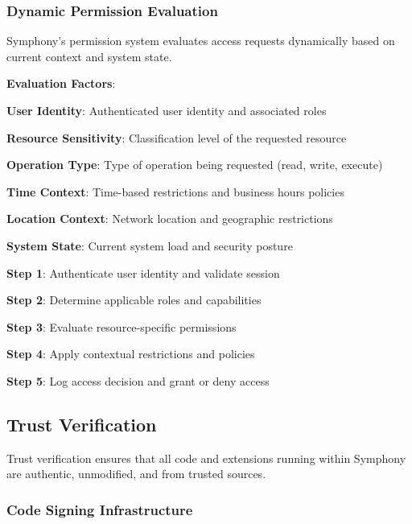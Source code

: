 \subsubsection*{Dynamic Permission Evaluation}

Symphony's permission system evaluates access requests dynamically based on current context and system state.

\textbf{Evaluation Factors}:
\begin{compactlist}
    \item \textbf{User Identity}: Authenticated user identity and associated roles
    \item \textbf{Resource Sensitivity}: Classification level of the requested resource
    \item \textbf{Operation Type}: Type of operation being requested (read, write, execute)
    \item \textbf{Time Context}: Time-based restrictions and business hours policies
    \item \textbf{Location Context}: Network location and geographic restrictions
    \item \textbf{System State}: Current system load and security posture
\end{compactlist}

\begin{infobox}[title=Permission Evaluation Algorithm]
\textbf{Step 1}: Authenticate user identity and validate session

\textbf{Step 2}: Determine applicable roles and capabilities

\textbf{Step 3}: Evaluate resource-specific permissions

\textbf{Step 4}: Apply contextual restrictions and policies

\textbf{Step 5}: Log access decision and grant or deny access
\end{infobox}

\subsection*{Trust Verification}

Trust verification ensures that all code and extensions running within Symphony are authentic, unmodified, and from trusted sources.

\subsubsection*{Code Signing Infrastructure}


